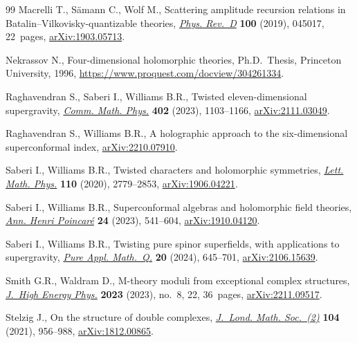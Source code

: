 \documentclass[pdftex]{sigma}
\numberwithin{equation}{section}
\theoremstyle{definition}
\begin{document}
\begin{thebibliography}{99}
Macrelli T., S\"amann C., Wolf M., Scattering amplitude recursion relations in
 {B}atalin--{V}ilkovisky-quantizable theories,
 \href{https://doi.org/10.1103/physrevd.100.045017}{\textit{Phys. Rev.~D}}
 \textbf{100} (2019), 045017, 22~pages,
 \href{http://arxiv.org/abs/1903.05713}{arXiv:1903.05713}.

Nekrassov N., Four-dimensional holomorphic theories, Ph.D.~Thesis, {P}rinceton
 University, 1996, \url{https://www.proquest.com/docview/304261334}.

Raghavendran S., Saberi I., Williams B.R., Twisted eleven-dimensional
 supergravity, \href{https://doi.org/10.1007/s00220-023-04745-2}{\textit{Comm.
 Math. Phys.}} \textbf{402} (2023), 1103--1166,
 \href{http://arxiv.org/abs/2111.03049}{arXiv:2111.03049}.

Raghavendran S., Williams B.R., A holographic approach to the six-dimensional
 superconformal index,
 \href{http://arxiv.org/abs/2210.07910}{arXiv:2210.07910}.

Saberi I., Williams B.R., Twisted characters and holomorphic symmetries,
 \href{https://doi.org/10.1007/s11005-020-01319-4}{\textit{Lett. Math. Phys.}}
 \textbf{110} (2020), 2779--2853,
 \href{http://arxiv.org/abs/1906.04221}{arXiv:1906.04221}.

Saberi I., Williams B.R., Superconformal algebras and holomorphic field
 theories, \href{https://doi.org/10.1007/s00023-022-01224-7}{\textit{Ann.
 Henri Poincar\'e}} \textbf{24} (2023), 541--604,
 \href{http://arxiv.org/abs/1910.04120}{arXiv:1910.04120}.

Saberi I., Williams B.R., Twisting pure spinor superfields, with applications
 to supergravity,
 \href{https://doi.org/10.4310/pamq.2024.v20.n2.a2}{\textit{Pure Appl.
 Math.~Q.}} \textbf{20} (2024), 645--701,
 \href{http://arxiv.org/abs/2106.15639}{arXiv:2106.15639}.

Smith G.R., Waldram D., M-theory moduli from exceptional complex structures,
 \href{https://doi.org/10.1007/jhep08(2023)022}{\textit{J.~High Energy Phys.}}
 \textbf{2023} (2023), no.~8, 22, 36~pages,
 \href{http://arxiv.org/abs/2211.09517}{arXiv:2211.09517}.

Stelzig J., On the structure of double complexes,
 \href{https://doi.org/10.1112/jlms.12453}{\textit{J.~Lond. Math. Soc.~(2)}}
 \textbf{104} (2021), 956--988,
 \href{http://arxiv.org/abs/1812.00865}{arXiv:1812.00865}.


\end{thebibliography}
\end{document}
